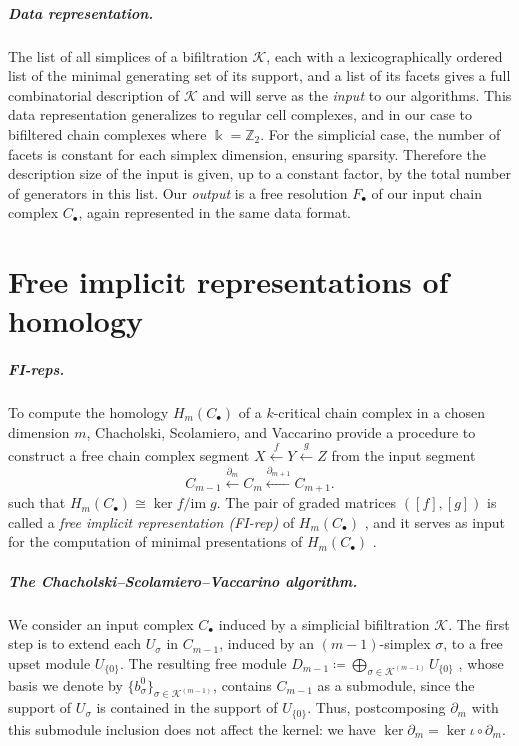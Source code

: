 \documentclass[a4paper,UKenglish,cleveref,nolineno,autoref]{socg-lipics-v2021}
\newcommand{\define}[1]{\emph{#1}} %
\newcommand{\field}{\Bbbk}
\newcommand{\im}{\mathrm{im}\;}
\begin{document}
\subparagraph{Data representation.} The list of all simplices of a bifiltration $\mathcal{K}$, each with a lexicographically ordered list of the minimal generating set of its support, and a list of its facets gives a full combinatorial description of $\mathcal{K}$ and will serve as the \define{input} to our algorithms.
This data representation generalizes to regular cell complexes, and in our case to bifiltered chain complexes where $\field=\mathbb{Z}_2$.
For the simplicial case, the number of facets is constant for each simplex dimension, ensuring sparsity.
Therefore the description size of the input is given, up to a constant factor, by the total number of generators in this list. 
Our \define{output} is a free resolution $F_\bullet$ of our input chain complex $C_\bullet$, again represented in the same data format. 



\section{Free implicit representations of homology}
\label{sec:FI-reps}

\subparagraph{FI-reps.} To compute the homology $H_m(C_\bullet)$ of a $k$-critical chain complex in a chosen dimension $m$, Chacholski, Scolamiero, and Vaccarino \cite{swedish} provide a procedure
to construct a free chain complex segment $X \xleftarrow{f} Y \xleftarrow{g} Z $ from the input segment
\begin{equation}
\label{diag:chain_complex_segment}
C_{m-1}\xleftarrow{\partial_m} C_m \xleftarrow{\partial_{m+1}}C_{m+1}.
\end{equation}
such that $H_m(C_\bullet)\cong \ker f / \im g$. The pair of graded matrices $([f],[g])$ is called a \define{free implicit representation (FI-rep)} of $H_m(C_\bullet)$ \cite{lw-computing}, and it serves as input for the computation of minimal presentations of $H_m(C_\bullet)$ \cite{lw-computing,kr-fast}. 




\subparagraph{The Chacholski--Scolamiero--Vaccarino algorithm.} We consider an input complex $C_\bullet$ induced by a simplicial bifiltration $\mathcal{K}$.
The first step is to extend each $U_\sigma$ in $C_{m-1}$, induced by an $(m-1)$-simplex $\sigma$, to a free upset module $U_{\{0\}}$.
The resulting free module $D_{m-1}\coloneqq 
\bigoplus_{\sigma\in \mathcal{K}^{(m-1)}} U_{\{0\}}$ , whose basis we denote by $\{b_\sigma^0\}_{\sigma\in \mathcal{K}^{(m-1)}}$, contains $C_{m-1}$ as a submodule, since the support of $U_\sigma$ is contained in the support of $U_{\{0\}}$.
Thus, postcomposing $\partial_m$ with this submodule inclusion does not affect the kernel: we have $\ker\partial_{m} = \ker\iota\circ\partial_{m}$.
\end{document}
